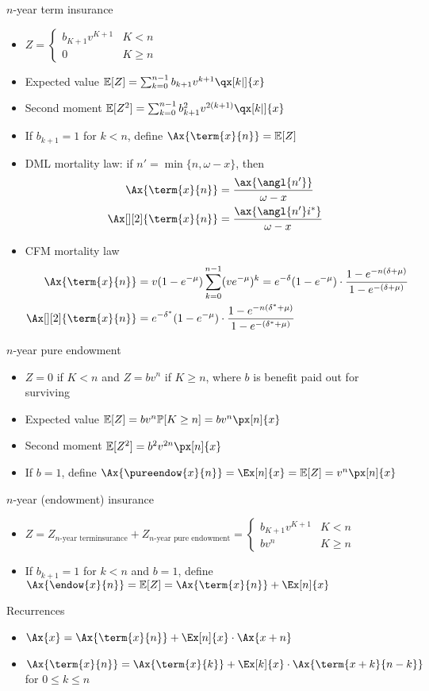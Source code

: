 $n$-year term insurance
\begin{itemize}
\item $Z = \begin{cases} b_{K + 1}v^{K + 1} & K < n \\ 0 & K\geq n \end{cases}$
\item Expected value $\mathbb{E}[Z] = \sum_{k = 0}^{n - 1} b_{k + 1}v^{k + 1}\qx[k|]{x}$
\item Second moment $\mathbb{E}[Z^2] = \sum_{k = 0}^{n - 1} b_{k + 1}^2v^{2(k + 1)}\qx[k|]{x}$
\item If $b_{k + 1} = 1$ for $k < n$, define $\Ax{\term{x}{n}} = \mathbb{E}[Z]$
\item DML mortality law: if $n' = \min\{n, \omega - x\}$, then
\begin{align*}
\Ax{\term{x}{n}} &= \frac{\ax{\angl{n'}}}{\omega - x} \\
\Ax[][2]{\term{x}{n}} &= \frac{\ax{\angl{n'}i^{*}}}{\omega - x}
\end{align*}
\item CFM mortality law
\begin{align*}
\Ax{\term{x}{n}} &= v(1 - e^{-\mu})\sum_{k = 0}^{n - 1} (ve^{-\mu})^k = e^{-\delta}(1 - e^{-\mu})\cdot\frac{1 - e^{-n(\delta + \mu)}}{1 - e^{-(\delta + \mu)}} \\
\Ax[][2]{\term{x}{n}} &= e^{-\delta^{*}}(1 - e^{-\mu})\cdot\frac{1 - e^{-n(\delta^{*} + \mu)}}{1 - e^{-(\delta^{*} + \mu)}}
\end{align*}
\end{itemize}

$n$-year pure endowment
\begin{itemize}
\item $Z = 0$ if $K < n$ and $Z = bv^n$ if $K\geq n$, where $b$ is benefit paid out for surviving
\item Expected value $\mathbb{E}[Z] = bv^n\mathbb{P}[K\geq n] = bv^n\px[n]{x}$
\item Second moment $\mathbb{E}[Z^2] = b^2v^{2n}\px[n]{x}$
\item If $b = 1$, define $\Ax{\pureendow{x}{n}} = \Ex[n]{x} = \mathbb{E}[Z] = v^n\px[n]{x}$
\end{itemize}

$n$-year (endowment) insurance
\begin{itemize}
\item $Z = Z_{n\text{-year terminsurance}} + Z_{n\text{-year pure endowment}} = \begin{cases} b_{K + 1}v^{K + 1} & K < n \\ bv^n & K\geq n \end{cases}$
\item If $b_{k + 1} = 1$ for $k < n$ and $b = 1$, define $\Ax{\endow{x}{n}} = \mathbb{E}[Z] = \Ax{\term{x}{n}} + \Ex[n]{x}$
\end{itemize}

Recurrences
\begin{itemize}
\item $\Ax{x} = \Ax{\term{x}{n}} + \Ex[n]{x}\cdot\Ax{x + n}$
\item $\Ax{\term{x}{n}} = \Ax{\term{x}{k}} + \Ex[k]{x}\cdot\Ax{\term{x + k}{n - k}}$ for $0\leq k\leq n$
\end{itemize}